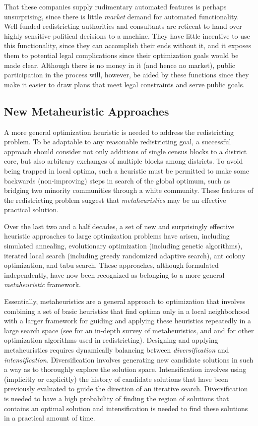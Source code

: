 \documentclass[article]{JSSstyle/jss}
\begin{document}
That these companies supply rudimentary automated features is perhaps unsurprising,  since there is little \emph{market} demand for automated functionality. Well-funded redistricting authorities and consultants are reticent to hand over highly sensitive political decisions to a machine. They have little incentive to use this functionality, since they can accomplish their ends without it, and it exposes them to potential legal complications since their optimization goals would be made clear. Although there is no money in it (and hence no market), public participation in the process will, however, be aided by these functions since they make it easier to draw plans that meet legal constraints and serve public goals.

\subsection{New Metaheuristic Approaches} 

A more general optimization heuristic is needed to address the redistricting problem. To be adaptable to any
reasonable redistricting goal, a successful approach should consider not only additions 
of single census blocks to a district core, but also arbitrary exchanges of multiple blocks among districts.  
To avoid being trapped in local optima, such a heuristic must be permitted to make 
some backwards (non-improving) steps in search of the global optimum, such as 
bridging two minority communities through a white community. These features 
of the redistricting problem suggest that \emph{metaheuristics} may be an effective practical solution.
 
Over the last two and a half decades, a set of new and surprisingly 
effective heuristic approaches to large optimization problems have 
arisen, including simulated annealing, evolutionary optimization 
(including genetic algorithms), iterated local search (including 
greedy randomized adaptive search), ant colony optimization, and 
tabu search.  These approaches, although formulated independently, 
have now been recognized as belonging to a more general \emph{metaheuristic} framework.

Essentially, metaheuristics are a general approach to optimization that involves 
combining a set of basic heuristics that find optima only in a local neighborhood with a 
larger framework for guiding and applying these heuristics 
repeatedly in a large search space (see \citet{BlumRoli03} for an in-depth 
survey of metaheuristics, and \citet{Altman97} \citet{CortonaEtAl99} and 
\citet{Xiao03} for other optimization algorithms used in redistricting).  
Designing and applying metaheuristics requires dynamically 
balancing between \emph{diversification}  and \emph{intensification}. Diversification involves generating new 
candidate solutions in such a way as to thoroughly explore the solution space. Intensification involves using (implicitly or explicitly) 
the history of candidate solutions that have been previously evaluated to guide the direction of an iterative search. 
Diversification is needed to have a high probability of finding the region of solutions that contains an optimal solution 
and intensification is needed to find these solutions in a practical amount of time. 
\end{document}
